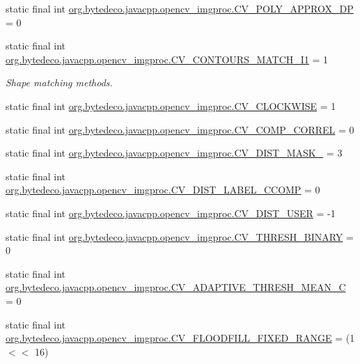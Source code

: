 \begin{DoxyCompactItemize}
\item 
static final int \hyperlink{group__imgproc__c_ga3508524a44f4fc55f4d5b4651dd27e0b}{org.\+bytedeco.\+javacpp.\+opencv\+\_\+imgproc.\+C\+V\+\_\+\+P\+O\+L\+Y\+\_\+\+A\+P\+P\+R\+O\+X\+\_\+\+DP} = 0
\item 
static final int \hyperlink{group__imgproc__c_gacb3ea9232f2555aa0f32d0ac29c44414}{org.\+bytedeco.\+javacpp.\+opencv\+\_\+imgproc.\+C\+V\+\_\+\+C\+O\+N\+T\+O\+U\+R\+S\+\_\+\+M\+A\+T\+C\+H\+\_\+\+I1} = 1
\begin{DoxyCompactList}\small\item\em Shape matching methods. \end{DoxyCompactList}\item 
static final int \hyperlink{group__imgproc__c_gae2c5ffaf8ec924eefd838dc3f2ce715c}{org.\+bytedeco.\+javacpp.\+opencv\+\_\+imgproc.\+C\+V\+\_\+\+C\+L\+O\+C\+K\+W\+I\+SE} = 1
\item 
static final int \hyperlink{group__imgproc__c_ga19d630356bddcc778302f908259f7f05}{org.\+bytedeco.\+javacpp.\+opencv\+\_\+imgproc.\+C\+V\+\_\+\+C\+O\+M\+P\+\_\+\+C\+O\+R\+R\+EL} = 0
\item 
static final int \hyperlink{group__imgproc__c_gaba3e402b3c0ce6821575a846d3473ff5}{org.\+bytedeco.\+javacpp.\+opencv\+\_\+imgproc.\+C\+V\+\_\+\+D\+I\+S\+T\+\_\+\+M\+A\+S\+K\+\_} = 3
\item 
static final int \hyperlink{group__imgproc__c_ga020e0b6cf0f5935cc6d68815b04f7651}{org.\+bytedeco.\+javacpp.\+opencv\+\_\+imgproc.\+C\+V\+\_\+\+D\+I\+S\+T\+\_\+\+L\+A\+B\+E\+L\+\_\+\+C\+C\+O\+MP} = 0
\item 
static final int \hyperlink{group__imgproc__c_gad0b2f87dbc9bce7d2a18cf13cf1ccc79}{org.\+bytedeco.\+javacpp.\+opencv\+\_\+imgproc.\+C\+V\+\_\+\+D\+I\+S\+T\+\_\+\+U\+S\+ER} = -\/1
\item 
static final int \hyperlink{group__imgproc__c_gaf5fab0d499ae9f3e639abf67052b7bc0}{org.\+bytedeco.\+javacpp.\+opencv\+\_\+imgproc.\+C\+V\+\_\+\+T\+H\+R\+E\+S\+H\+\_\+\+B\+I\+N\+A\+RY} = 0
\item 
static final int \hyperlink{group__imgproc__c_ga6503a819d73170b078c6d83a7f160393}{org.\+bytedeco.\+javacpp.\+opencv\+\_\+imgproc.\+C\+V\+\_\+\+A\+D\+A\+P\+T\+I\+V\+E\+\_\+\+T\+H\+R\+E\+S\+H\+\_\+\+M\+E\+A\+N\+\_\+C} = 0
\item 
static final int \hyperlink{group__imgproc__c_gac18e8679fec0c9c885f48bb38cab30d3}{org.\+bytedeco.\+javacpp.\+opencv\+\_\+imgproc.\+C\+V\+\_\+\+F\+L\+O\+O\+D\+F\+I\+L\+L\+\_\+\+F\+I\+X\+E\+D\+\_\+\+R\+A\+N\+GE} = (1 $<$$<$ 16)
$$
\end{DoxyCompactItemize}
